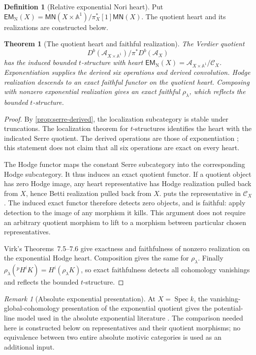 \documentclass[11pt]{article}
\numberwithin{equation}{section}
\newtheorem{theorem}{Theorem}[section]
\theoremstyle{definition}
\newtheorem{definition}[definition]{Definition}
\theoremstyle{remark}
\newtheorem{remark}[remark]{Remark}
\newcommand{\A}{\mathbb A}
\newcommand{\Ccal}{\mathcal C}
\newcommand{\MN}{\mathsf{MN}}
\newcommand{\EM}{\mathsf{EM}_{\mathrm N}}
\newcommand{\Spec}{\operatorname{Spec}}
\newcommand{\pH}{{}^{p}\!H}
\begin{document}
\begin{definition}[Relative exponential Nori heart]\label{def:EMN}
Put $\EM(X)=\MN(X\times\A^1)/\pi_X^*[1]\MN(X)$.
The quotient heart and its realizations are constructed below.
\end{definition}

\begin{theorem}[The quotient heart and faithful realization]\label{thm:quotient}\label{thm:heart-full}
The Verdier quotient
\[
 D^b(\mathcal A_{X\times\A^1})/\pi^*D^b(\mathcal A_X)
\]
has the induced bounded $t$-structure with heart
$\EM(X)=\mathcal A_{X\times\A^1}/\Ccal_X$.
Exponentiation supplies the derived six operations and derived convolution.
Hodge realization descends to an exact faithful functor on the quotient
heart. Composing with nonzero exponential realization gives an exact
faithful $\rho_\lambda$, which reflects the bounded $t$-structure.
\end{theorem}
\begin{proof}
By \cref{prop:serre-derived}, the localization subcategory is stable under
truncations. The localization theorem for $t$-structures identifies the
heart with the indicated Serre quotient. The derived operations are those
of exponentiation \cite{GallauerPepin}; this statement does not claim
that all six operations are exact on every heart.

The Hodge functor maps the constant Serre subcategory into the corresponding
Hodge subcategory. It thus induces an exact quotient functor. If a quotient
object has zero Hodge image, any heart representative has Hodge realization
pulled back from $X$, hence Betti realization pulled back from $X$.
 puts the representative in $\Ccal_X$.
The induced exact functor therefore detects zero objects, and is faithful:
apply detection to the image of any morphism it kills. This argument does
not require an arbitrary quotient morphism to lift to a morphism between
particular chosen representatives.

Virk's Theorems~7.5--7.6 give exactness and faithfulness of nonzero
realization on the exponential Hodge heart. Composition gives the same for
$\rho_\lambda$. Finally
$\rho_\lambda(\pH^iK)=H^i(\rho_\lambda K)$, so exact faithfulness detects
all cohomology vanishings and reflects the bounded $t$-structure.
\end{proof}

\begin{remark}[Absolute exponential presentation]\label{rem:absolute-FJ}
At $X=\Spec k$, the vanishing-global-cohomology presentation of the
exponential quotient gives the potential-line model used in the absolute
exponential literature \cite{Virk,FresanJossenExp}. The comparison needed
here is constructed below on representatives and their quotient morphisms;
no equivalence between two entire absolute motivic categories is used as
an additional input.
\end{remark}
\end{document}
